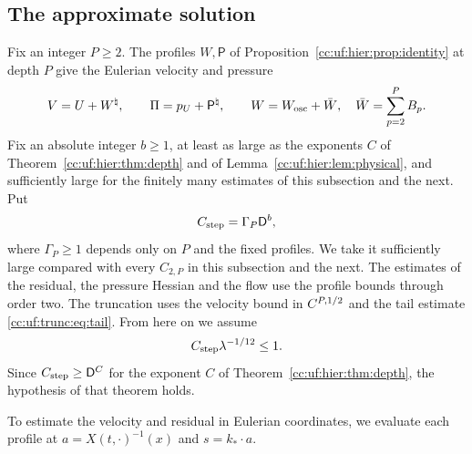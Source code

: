 \subsection{The approximate solution}\label{cc:uf:sec:approximate}
Fix an integer $P\ge2$. The profiles $W,\mathsf P$ of
Proposition~\ref{cc:uf:hier:prop:identity} at depth $P$ give the
Eulerian velocity and pressure
\[
 V=U+W^\natural,\qquad \Pi=p_U+\mathsf P^\natural,\qquad
 W=W_{\rm osc}+\bar W,\quad \bar W=\sum_{p=2}^PB_p .
\]
Fix an absolute integer $b\ge1$, at least as large
as the exponents $C$ of Theorem~\ref{cc:uf:hier:thm:depth} and of
Lemma~\ref{cc:uf:hier:lem:physical}, and sufficiently large for the
finitely many estimates of this subsection and the next. Put
\[
 C_{\rm step}=\Gamma_P\mathsf D^b,
\]
where $\Gamma_P\ge1$ depends only on $P$ and the fixed profiles.
We take it sufficiently large compared with every $C_{2,P}$ in this
subsection and the next. The estimates of the residual, the pressure
Hessian and the flow use the profile bounds through order two. The
truncation uses the velocity bound in $C^{P,1/2}$ and the tail estimate
\eqref{cc:uf:trunc:eq:tail}. From here on we assume
\begin{equation}\label{cc:uf:step:eq:small}
 C_{\rm step}\lambda^{-1/12}\le1 .
\end{equation}
Since $C_{\rm step}\ge\mathsf D^C$ for the exponent $C$ of
Theorem~\ref{cc:uf:hier:thm:depth}, the hypothesis of that theorem
holds.

To estimate the velocity and residual in Eulerian coordinates, we evaluate
each profile at $a=X(t,\cdot)^{-1}(x)$ and $s=k_*\cdot a$.

